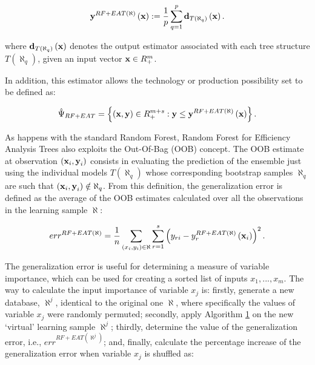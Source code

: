 \begin{equation} \label{(6)} 
{\it \textbf{y}}^{RF+EAT\left(\aleph \right)} \left({\it \textbf{x}}\right):=\frac{1}{p} \sum_{q=1}^{p}{\it \textbf{d}}_{T\left(\aleph _{q} \right)} \left({\it \textbf{x}}\right).  
\end{equation}

where
\({\it \textbf{d}}_{T\left(\aleph _{q} \right)} \left({\it \textbf{x}}\right)\)
denotes the output estimator associated with each tree structure
\(T\left(\aleph _{q} \right)\), given an input vector
\({\it \textbf{x}}\in R_{+}^{m}\).

In addition, this estimator allows the technology or production
possibility set to be defined as:

\begin{equation} \label{(7)} 
\hat{\Psi }_{RF+EAT} =\left\{\left({\it \textbf{x}},{\it \textbf{y}}\right)\in R_{+}^{m+s} :{\it \textbf{y}}\le {\it \textbf{y}}^{RF+EAT\left(\aleph \right)} \left({\it \textbf{x}}\right)\right\}. 
\end{equation}

As happens with the standard Random Forest, Random Forest for Efficiency
Analysis Trees also exploits the Out-Of-Bag (OOB) concept. The OOB
estimate at observation
\(\left({\it \textbf{x}}_{i} ,{\it \textbf{y}}_{i} \right)\) consists in
evaluating the prediction of the ensemble just using the individual
models \(T\left(\aleph _{q} \right)\) whose corresponding bootstrap
samples \(\aleph _{q}\) are such that
\(\left({\it \textbf{x}}_{i},{\it \textbf{y}}_{i} \right)\notin \aleph _{q}\).
From this definition, the generalization error is defined as the average
of the OOB estimates calculated over all the observations in the
learning sample \(\aleph\):

\begin{equation} \label{(8)} 
err^{RF+EAT\left(\aleph \right)} =\frac{1}{n} \sum_{\left(x_{i} ,y_{i} \right)\in \aleph }\sum_{r=1}^{s}\left(y_{ri} -y_{r}^{RF+EAT\left(\aleph \right)} \left({\it \textbf{x}}_{i} \right)\right)^{2}.    
\end{equation}

The generalization error is useful for determining a measure of variable
importance, which can be used for creating a sorted list of inputs
\(x_{1} ,...,x_{m}\). The way to calculate the input importance of
variable \(x_{j}\) is: firstly, generate a new database,
\(\aleph ^{j}\), identical to the original one \(\aleph\), where
specifically the values of variable \(x_{j}\) were randomly permuted;
secondly, apply Algorithm \hyperref[alg:algo1]{1} on the new `virtual'
learning sample \(\aleph ^{j}\); thirdly, determine the value of the
generalization error, i.e., \(err^{RF+EAT\left(\aleph ^{j} \right)}\);
and, finally, calculate the percentage increase of the generalization
error when variable \(x_{j}\) is shuffled as:


